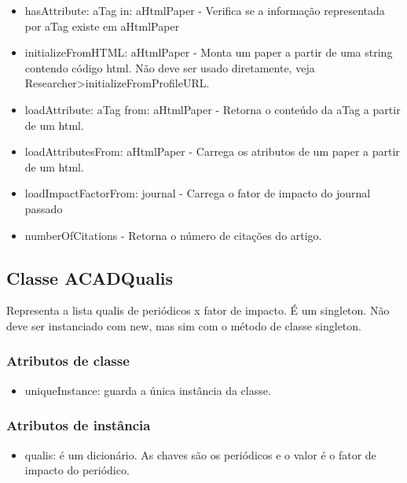 \begin{itemize}

    \item hasAttribute: aTag in: aHtmlPaper - Verifica se a informação representada por aTag existe em aHtmlPaper
 
   \item initializeFromHTML: aHtmlPaper - Monta um paper a partir de uma string contendo código html. Não deve ser usado diretamente, veja Researcher>initializeFromProfileURL.
  
  \item loadAttribute: aTag from: aHtmlPaper - Retorna o conteúdo da aTag a partir de um html.
  
  \item loadAttributesFrom: aHtmlPaper - Carrega os atributos de um paper a partir de um html.
  
  \item loadImpactFactorFrom: journal - Carrega o fator de impacto do journal passado
  
  \item numberOfCitations - Retorna o número de citações do artigo.

\end{itemize}

\subsection{Classe ACADQualis}

Representa a lista qualis de periódicos x fator de impacto. É um singleton. Não deve ser instanciado com new, mas sim com o método de classe singleton.

\subsubsection{Atributos de classe}

\begin{itemize}
  \item uniqueInstance: guarda a única instância da classe.
\end{itemize}

\subsubsection{Atributos de instância}

\begin{itemize}
  \item qualis: é um dicionário. As chaves são os periódicos e o valor é o fator de impacto do periódico.
\end{itemize}

